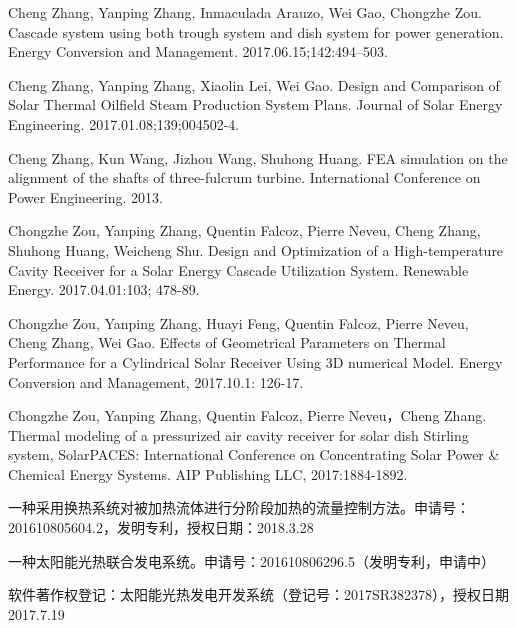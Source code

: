 \begin{publications}
  \item Cheng Zhang, Yanping Zhang, Inmaculada Arauzo, Wei Gao, Chongzhe  Zou. Cascade system using both trough system and dish system for power generation. Energy Conversion and Management. 2017.06.15;142:494–503.
  \item Cheng Zhang, Yanping Zhang, Xiaolin Lei, Wei Gao. Design and Comparison of Solar Thermal Oilfield Steam Production System Plans. Journal of Solar Energy Engineering. 2017.01.08;139;004502-4.
  \item Cheng Zhang, Kun Wang, Jizhou Wang, Shuhong Huang. FEA simulation on the alignment of the shafts of three-fulcrum turbine. International Conference on Power Engineering. 2013.
  \item Chongzhe Zou, Yanping Zhang, Quentin Falcoz, Pierre Neveu, Cheng Zhang, Shuhong Huang, Weicheng Shu. Design and Optimization of a High-temperature Cavity Receiver for a Solar Energy Cascade Utilization System. Renewable Energy. 2017.04.01:103; 478-89.
  \item Chongzhe Zou, Yanping Zhang, Huayi Feng, Quentin Falcoz, Pierre Neveu, Cheng Zhang, Wei Gao. Effects of Geometrical Parameters on Thermal Performance for a Cylindrical Solar Receiver Using 3D numerical Model. Energy Conversion and Management, 2017.10.1: 126-17.
  \item Chongzhe Zou, Yanping Zhang, Quentin Falcoz, Pierre Neveu，Cheng Zhang. Thermal modeling of a pressurized air cavity receiver for solar dish Stirling system, SolarPACES: International Conference on Concentrating Solar Power \& Chemical Energy Systems. AIP Publishing LLC, 2017:1884-1892.
  
  \item 一种采用换热系统对被加热流体进行分阶段加热的流量控制方法。申请号：201610805604.2，发明专利，授权日期：2018.3.28
  \item 一种太阳能光热联合发电系统。申请号：201610806296.5（发明专利，申请中）
  \item 软件著作权登记：太阳能光热发电开发系统（登记号：2017SR382378），授权日期2017.7.19
  
\end{publications}